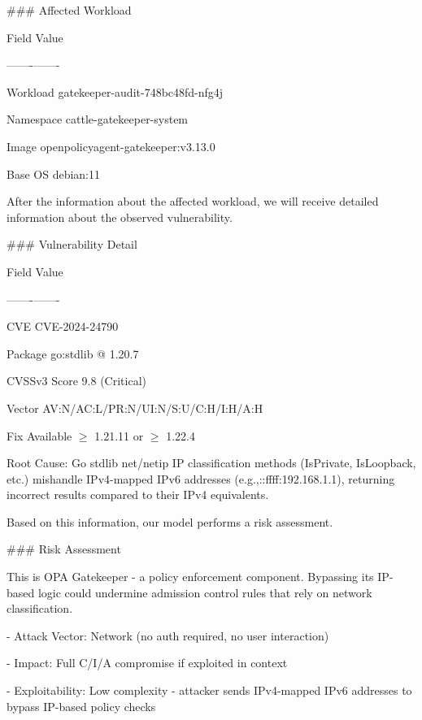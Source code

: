 \indent\colorbox{codegrey}{
    \parbox{0.8\linewidth}{
\#\#\# Affected Workload

\textbar{} Field \textbar{} Value \textbar{}

\textbar{}-------\textbar{}-------\textbar{}

\textbar{} Workload \textbar{} gatekeeper-audit-748bc48fd-nfg4j \textbar{}

\textbar{} Namespace \textbar{} cattle-gatekeeper-system \textbar{}

\textbar{} Image \textbar{} openpolicyagent-gatekeeper:v3.13.0 \textbar{}

\textbar{} Base OS \textbar{} debian:11 \textbar{}
     }
}

After the information about the affected workload, we will receive detailed information about the observed vulnerability.

\indent\colorbox{codegrey}{
    \parbox{0.8\linewidth}{
\#\#\# Vulnerability Detail

\textbar{} Field \textbar{} Value \textbar{}

\textbar{}-------\textbar{}-------\textbar{}

\textbar{} CVE \textbar{} CVE-2024-24790 \textbar{}

\textbar{} Package \textbar{} go:stdlib @ 1.20.7 \textbar{}

\textbar{} CVSSv3 Score \textbar{} 9.8 (Critical) \textbar{}

\textbar{} Vector \textbar{} AV:N/AC:L/PR:N/UI:N/S:U/C:H/I:H/A:H \textbar{}

\textbar{} Fix Available \textbar{} $\ge$ 1.21.11 or $\ge$ 1.22.4 \textbar{}

Root Cause: Go stdlib net/netip IP classification methods (IsPrivate, IsLoopback, etc.) mishandle IPv4-mapped IPv6 addresses (e.g.,::ffff:192.168.1.1), returning incorrect results compared to their IPv4 equivalents.
    }
}

Based on this information, our model performs a risk assessment.

\indent\colorbox{codegrey}{
    \parbox{0.8\linewidth}{
\#\#\# Risk Assessment

This is OPA Gatekeeper - a policy enforcement component. Bypassing its IP-based logic could undermine admission control rules that rely on network classification.

- Attack Vector: Network (no auth required, no user interaction)

- Impact: Full C/I/A compromise if exploited in context

- Exploitability: Low complexity - attacker sends IPv4-mapped IPv6 addresses to bypass IP-based policy checks
    }
}

